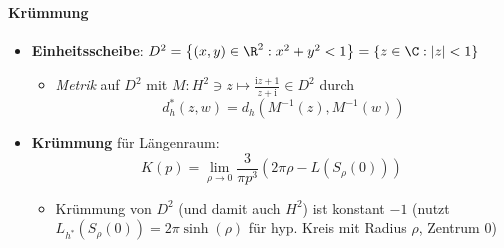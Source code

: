 \paragraph{Krümmung}
\begin{itemize}
  \item \textbf{Einheitsscheibe}: \( D^2 = \left \{ (x,y) \in \R^2 : x^2 + y^2 < 1 \right \} = \left \{ z \in \C : \left\vert z \right\vert < 1 \right \} \)
  \begin{itemize}
    \item \emph{Metrik} auf \( D^2 \) mit \( M: H^2 \ni z \mapsto \frac{\text{i}z + 1}{z + \text{i}} \in D^2 \) durch
    \begin{equation*}
      d_h^\ast(z,w) = d_h(M^{-1}(z),M^{-1}(w))
    \end{equation*}
  \end{itemize}
  \item \textbf{Krümmung} für Längenraum:
  \begin{equation*}
    K(p) = \lim_{\rho \to 0} \frac{3}{\pi p^3}(2\pi\rho - L(S_\rho(0)))
  \end{equation*}
  \begin{itemize}
    \item Krümmung von \( D^2 \) (und damit auch \( H^2 \)) ist konstant \( -1 \) (nutzt \( L_{h^\ast}(S_\rho(0)) = 2\pi\sinh(\rho) \) für hyp. Kreis mit Radius \( \rho \), Zentrum \( 0 \))
  \end{itemize}
\end{itemize}